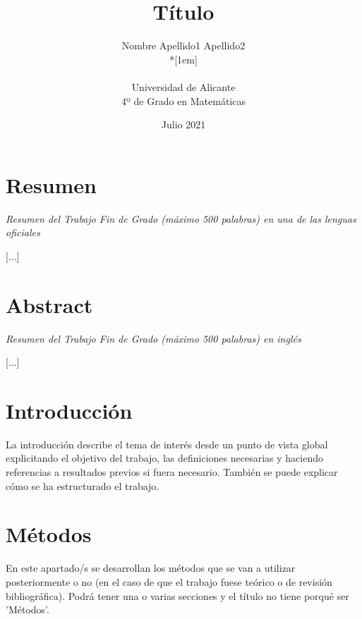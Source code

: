 \documentclass[12pt,twoside]{article}
\title{Título}
\author{Nombre Apellido1 Apellido2\\*[1em]
\begin{minipage}{0.75\textwidth}
\footnotesize \itshape
\begin{center}
Universidad de Alicante \\
4º de Grado en Matemáticas
\end{center}
\end{minipage}
}
\date{Julio 2021}
\begin{document}




\section*{Resumen}


\emph{Resumen del Trabajo Fin de Grado (máximo 500 palabras) en una de las lenguas oficiales}



[...]

\newpage

\section*{Abstract}

\emph{Resumen del Trabajo Fin de Grado (máximo 500 palabras) en inglés}

[...]

\newpage

\tableofcontents

\newpage

\section{Introducción}\label{sec:1}

{\color{red}
La introducción describe el tema de interés desde un punto de vista global explicitando el objetivo del trabajo, las definiciones necesarias y haciendo referencias a resultados previos si fuera necesario. También se puede explicar cómo se ha estructurado el trabajo.}

\section{Métodos}

{\color{red}
En este apartado/s se desarrollan los métodos que se van a utilizar posteriormente o no (en el caso de que el trabajo fuese teórico o de revisión bibliográfica). Podrá tener una o varias secciones y el título no tiene porqué ser 'Métodos'.}
\end{document}
